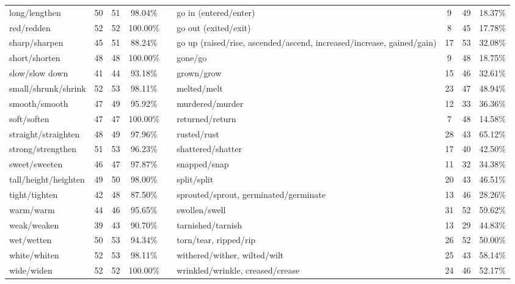 \begin{tabular}{p{3cm}ccccp{3cm}ccc}
long/lengthen & 50 & 51 & 98.04\% & & go in (entered/enter) & 9 & 49 & 18.37\% \\
red/redden & 52 & 52 & 100.00\% & & go out (exited/exit) & 8 & 45 & 17.78\% \\
sharp/sharpen & 45 & 51 & 88.24\% & & go up (raised/rise, ascended/ascend, increased/increase, gained/gain) & 17 & 53 & 32.08\% \\
short/shorten & 48 & 48 & 100.00\% & & gone/go & 9 & 48 & 18.75\% \\
slow/slow down & 41 & 44 & 93.18\% & & grown/grow & 15 & 46 & 32.61\% \\
small/shrunk/shrink & 52 & 53 & 98.11\% & & melted/melt & 23 & 47 & 48.94\% \\
smooth/smooth & 47 & 49 & 95.92\% & & murdered/murder & 12 & 33 & 36.36\% \\
soft/soften & 47 & 47 & 100.00\% & & returned/return & 7 & 48 & 14.58\% \\
straight/straighten & 48 & 49 & 97.96\% & & rusted/rust & 28 & 43 & 65.12\% \\
strong/strengthen & 51 & 53 & 96.23\% & & shattered/shatter & 17 & 40 & 42.50\% \\
sweet/sweeten & 46 & 47 & 97.87\% & & snapped/snap & 11 & 32 & 34.38\% \\
tall/height/heighten & 49 & 50 & 98.00\% & & split/split & 20 & 43 & 46.51\% \\
tight/tighten & 42 & 48 & 87.50\% & & sprouted/sprout, germinated/germinate & 13 & 46 & 28.26\% \\
warm/warm & 44 & 46 & 95.65\% & & swollen/swell & 31 & 52 & 59.62\% \\
weak/weaken & 39 & 43 & 90.70\% & & tarnished/tarnish & 13 & 29 & 44.83\% \\
wet/wetten & 50 & 53 & 94.34\% & & torn/tear, ripped/rip & 26 & 52 & 50.00\% \\
white/whiten & 52 & 53 & 98.11\% & & withered/wither, wilted/wilt & 25 & 43 & 58.14\% \\
wide/widen & 52 & 52 & 100.00\% & & wrinkled/wrinkle, creased/crease & 24 & 46 & 52.17\%
\end{tabular}
